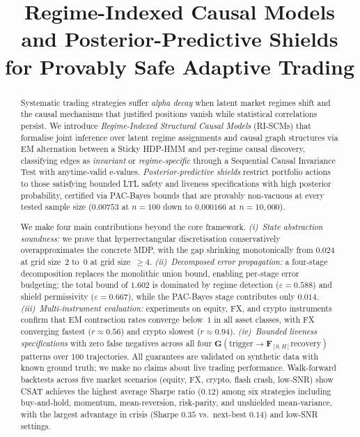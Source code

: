 \documentclass[11pt]{article}
\title{Regime-Indexed Causal Models and Posterior-Predictive Shields\\
       for Provably Safe Adaptive Trading}
\author{}
\date{}
\begin{document}
\maketitle

\begin{abstract}
Systematic trading strategies suffer \emph{alpha decay} when latent
market regimes shift and the causal mechanisms that justified positions
vanish while statistical correlations persist.  We introduce
\emph{Regime-Indexed Structural Causal Models} (RI-SCMs) that
formalise joint inference over latent regime assignments and causal
graph structures via EM alternation between a Sticky HDP-HMM and
per-regime causal discovery, classifying edges as \emph{invariant} or
\emph{regime-specific} through a Sequential Causal Invariance Test
with anytime-valid e-values.  \emph{Posterior-predictive shields}
restrict portfolio actions to those satisfying bounded LTL safety and
liveness specifications with high posterior probability, certified via
PAC-Bayes bounds that are provably non-vacuous at every tested sample
size ($0.00753$ at $n{=}100$ down to $0.000166$ at $n{=}10{,}000$).

We make four main contributions beyond the core framework.
\emph{(i)~State abstraction soundness:} we prove that
hyperrectangular discretisation conservatively overapproximates the
concrete MDP, with the gap shrinking monotonically from $0.024$ at
grid size~$2$ to~$0$ at grid size~$\ge 4$.
\emph{(ii)~Decomposed error propagation:} a four-stage decomposition
replaces the monolithic union bound, enabling per-stage error
budgeting; the total bound of $1.602$ is dominated by regime detection
($\varepsilon{=}0.588$) and shield permissivity
($\varepsilon{=}0.667$), while the PAC-Bayes stage contributes only
$0.014$.
\emph{(iii)~Multi-instrument evaluation:} experiments on equity, FX,
and crypto instruments confirm that EM contraction rates converge
below~$1$ in all asset classes, with FX converging fastest
($r{\approx}0.56$) and crypto slowest ($r{\approx}0.94$).
\emph{(iv)~Bounded liveness specifications} with zero false negatives
across all four $\mathbf{G}(\text{trigger}{\to}
\mathbf{F}_{[0,H]}\text{recovery})$ patterns over 100 trajectories.
All guarantees are validated on synthetic data with known ground truth;
we make no claims about live trading performance.
Walk-forward backtests across five market scenarios (equity, FX,
crypto, flash crash, low-SNR) show CSAT achieves the highest
average Sharpe ratio ($0.12$) among six strategies including
buy-and-hold, momentum, mean-reversion, risk-parity, and
unshielded mean-variance, with the largest advantage in crisis
(Sharpe $0.35$ vs.\ next-best $0.14$) and low-SNR settings.
\end{abstract}
\end{document}
